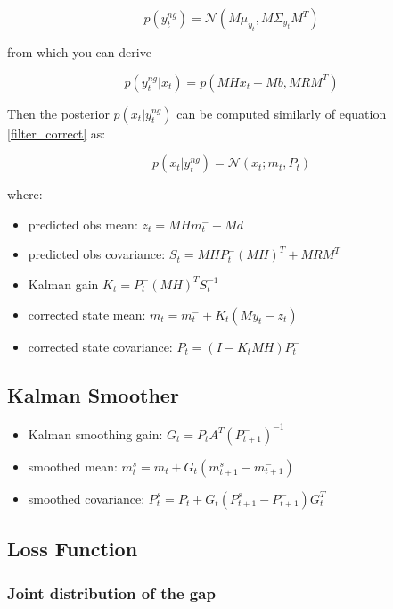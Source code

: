 \documentclass{article}
\begin{document}
$$ p(y^{ng}_t) = \mathcal{N}(M\mu_{y_t},  M\Sigma_{y_t}M^T)$$

from which you can derive

\begin{equation}\label{filter_correct_obs_missing}
    p(y^{ng}_t|x_t) = p(MHx_t + Mb, MRM^T) 
\end{equation}

Then the posterior $p(x_t|y_t^{ng})$ can be computed similarly of equation \ref{filter_correct} as:

\begin{equation}\label{filter_correct_missing}
 p(x_t|y^{ng}_t) = \mathcal{N}(x_t; m_t, P_t)   
\end{equation}
    
where:

\begin{itemize}
    \item predicted obs mean: $z_t = MHm_t^- + Md$   
    \item predicted obs covariance: $S_t = MHP_t^-(MH)^T + MRM^T$
    \item Kalman gain $K_t = P_t^-(MH)^TS_t^{-1}$ 
    \item corrected state mean: $m_t = m_t^- + K_t(My_t - z_t)$ 
    \item corrected state covariance: $P_t = (I-K_tMH)P_t^-$ 
\end{itemize}

\subsection{Kalman Smoother}

\begin{itemize}
    \item Kalman smoothing gain: $G_t = P_tA^T(P_{t+1}^-)^{-1}$
    \item smoothed mean: $m_t^s = m_t + G_t(m_{t+1}^s - m_{t+1}^-)$
    \item smoothed covariance: $P_t^s = P_t + G_t(P_{t+1}^s - P_{t+1}^-)G_t^T$
\end{itemize}


\subsection{Loss Function}

\subsubsection{Joint distribution of the gap}
\end{document}
